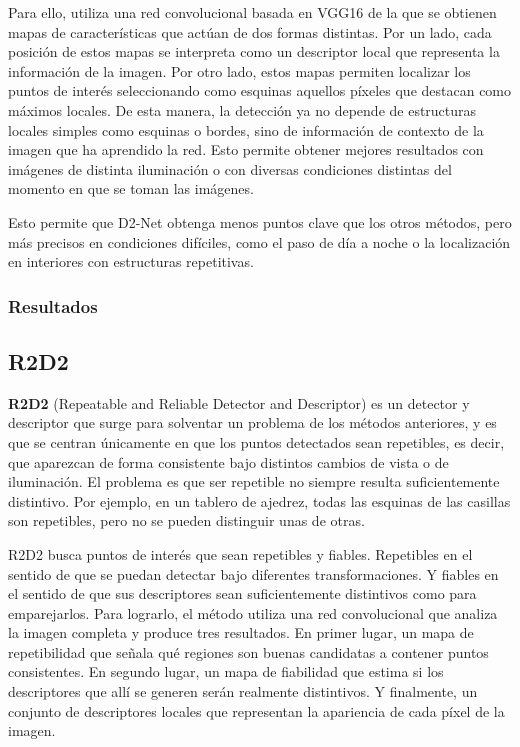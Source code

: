 Para ello, utiliza una red convolucional basada en VGG16 de la que se obtienen mapas de características que actúan de dos formas distintas. Por un lado, cada posición de estos mapas se interpreta como un descriptor local que representa la información de la imagen. Por otro lado, estos mapas permiten localizar los puntos de interés seleccionando como esquinas aquellos píxeles que destacan como máximos locales. De esta manera, la detección ya no depende de estructuras locales simples como esquinas o bordes, sino de información de contexto de la imagen que ha aprendido la red. Esto permite obtener mejores resultados con imágenes de distinta iluminación o con diversas condiciones distintas del momento en que se toman las imágenes.

Esto permite que D2-Net obtenga menos puntos clave que los otros métodos, pero más precisos en condiciones difíciles, como el paso de día a noche o la localización en interiores con estructuras repetitivas.

\subsubsection{Resultados}


\subsection{R2D2}

\textbf{R2D2} (Repeatable and Reliable Detector and Descriptor) \cite{revaud2019r2d2} es un detector y descriptor que surge para solventar un problema de los métodos anteriores, y es que se centran únicamente en que los puntos detectados sean repetibles, es decir, que aparezcan de forma consistente bajo distintos cambios de vista o de iluminación. El problema es que ser repetible no siempre resulta suficientemente distintivo. Por ejemplo, en un tablero de ajedrez, todas las esquinas de las casillas son repetibles, pero no se pueden distinguir unas de otras.  

R2D2 busca puntos de interés que sean repetibles y fiables. Repetibles en el sentido de que se puedan detectar bajo diferentes transformaciones. Y fiables en el sentido de que sus descriptores sean suficientemente distintivos como para emparejarlos. Para lograrlo, el método utiliza una red convolucional que analiza la imagen completa y produce tres resultados. En primer lugar, un mapa de repetibilidad que señala qué regiones son buenas candidatas a contener puntos consistentes. En segundo lugar, un mapa de fiabilidad que estima si los descriptores que allí se generen serán realmente distintivos. Y finalmente, un conjunto de descriptores locales que representan la apariencia de cada píxel de la imagen.  

